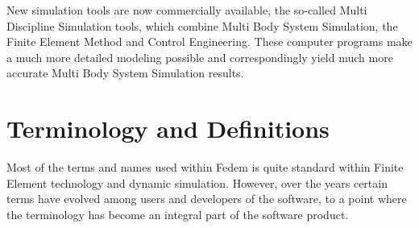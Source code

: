 New simulation tools are now commercially available, the so-called 
Multi Discipline Simulation tools, which combine Multi Body System 
Simulation, the Finite Element Method and Control Engineering. These 
computer programs make a much more detailed modeling possible and 
correspondingly yield much more accurate Multi Body System Simulation results.

\section{Terminology and Definitions}

Most of the terms and names used within Fedem is quite standard within Finite Element technology
and dynamic simulation. However, over the years certain terms have evolved among users and
developers of the software, to a point where the terminology has become an integral part of
the software product. 

